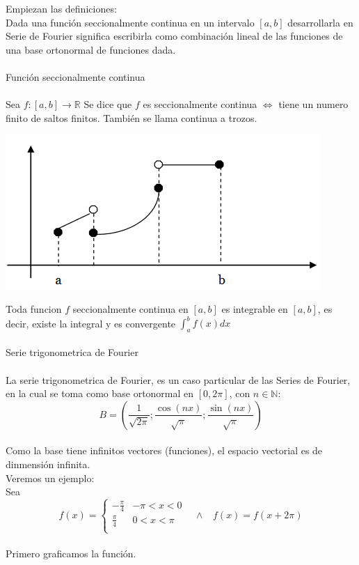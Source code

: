 \documentclass[]{article}
\begin{document}
Empiezan las definiciones:\\
Dada una función seccionalmente continua en un intervalo $[a,b]$ desarrollarla en Serie de Fourier significa escribirla como combinación lineal de las funciones de una base ortonormal de funciones dada.
\\
\\
\large Función seccionalmente continua
\normalsize
\\
\\
Sea $f:[a,b]\rightarrow \mathbb{R}$ Se dice que $f$ es seccionalmente continua $\Leftrightarrow$ tiene un numero finito de saltos finitos. También se llama continua a trozos.

\includegraphics{../../../Imagenes/Superior/Fourier/Fourier04.PNG}

Toda funcion $f$ seccionalmente continua en $[a,b]$ es integrable  en $[a,b]$, es decir, existe la integral y es convergente $\int_{a}^{b}f(x)dx$
\\
\\
\Large Serie trigonometrica de Fourier
\normalsize
\\
\\
La serie trigonometrica de Fourier, es un caso particular de las Series de Fourier, en la cual se toma como base ortonormal en $[0,2\pi]$, con $n\in \mathbb{N}$:
$$
B=(\frac{1}{\sqrt{2\pi}};\frac{\cos(nx)}{\sqrt{\pi}};\frac{\sin(nx)}{\sqrt{\pi}})
$$
\\
Como la base tiene infinitos vectores (funciones), el espacio vectorial es de dinmensión infinita.
\\
Veremos un ejemplo:
\\
Sea 
$$
f(x) = \left\{
	\begin{array}{ll}
		-\frac{\pi}{4}&  -\pi < x < 0 \\
		\frac{\pi}{4}& 0 < x < \pi \\
	\end{array}
\right. \hspace{10pt} \wedge \hspace{10pt} f(x) = f(x+2\pi)
$$
\\
Primero graficamos la función.
\end{document}

